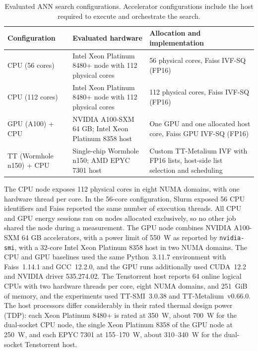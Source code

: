 \begin{table}[htbp]
\centering
\caption{Evaluated ANN search configurations. Accelerator configurations
include the host required to execute and orchestrate the search.}
\label{tab:experimental-platforms}
\small
\setlength{\tabcolsep}{5pt}
\renewcommand{\arraystretch}{1.12}
\begin{tabularx}{\textwidth}{l X X}
\toprule
Configuration & Evaluated hardware & Allocation and implementation \\
\midrule
CPU (56 cores) & Intel Xeon Platinum 8480+ node with 112 physical cores & 56 physical cores, Faiss IVF-SQ (FP16) \\
CPU (112 cores) & Intel Xeon Platinum 8480+ node with 112 physical cores & 112 physical cores, Faiss IVF-SQ (FP16) \\
GPU (A100) + CPU & NVIDIA A100-SXM 64 GB; Intel Xeon Platinum 8358 host & One GPU and one allocated host core, Faiss GPU IVF-SQ (FP16) \\
TT (Wormhole n150) + CPU & Single-chip Wormhole n150; AMD EPYC 7301 host & Custom TT-Metalium IVF with FP16 lists, host-side list selection and scheduling \\
\bottomrule
\end{tabularx}
\end{table}

The CPU node exposes 112 physical cores in eight NUMA domains, with one
hardware thread per core. In the 56-core configuration, Slurm exposed 56 CPU
identifiers and Faiss reported the same number of execution threads. All CPU
and GPU energy sessions ran on nodes allocated exclusively, so no other job
shared the node during a measurement. The GPU node
combines NVIDIA A100-SXM 64 GB accelerators, with a power limit of
550~W as reported by \texttt{nvidia-smi}, with a 32-core Intel Xeon Platinum
8358 host in two NUMA domains. The CPU and GPU baselines used the same
Python~3.11.7 environment with Faiss~1.14.1 and GCC~12.2.0, and the GPU runs
additionally used CUDA~12.2 and NVIDIA driver 535.274.02. The Tenstorrent host
reports 64 online logical CPUs with two hardware threads per core, eight NUMA
domains, and 251~GiB of memory, and the experiments used TT-SMI~3.0.38 and
TT-Metalium~v0.66.0. The host processors differ considerably in their rated
thermal design power (TDP): each Xeon Platinum 8480+ is rated at 350~W, about
700~W for the dual-socket CPU node, the single Xeon Platinum 8358 of the GPU
node at 250~W, and each EPYC 7301 at 155--170~W, about 310--340~W for the
dual-socket Tenstorrent host.

